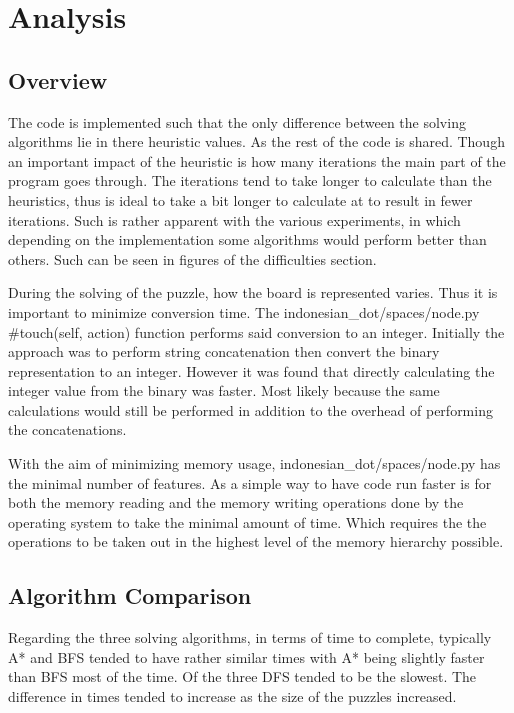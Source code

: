 \section{Analysis}
\subsection{Overview}
The code is implemented such that the only difference between the solving algorithms lie in there heuristic values. As the rest of the code is shared. Though an important impact of the heuristic is how many iterations the main part of the program goes through. The iterations tend to take longer to calculate than the heuristics, thus is ideal to take a bit longer to calculate at to result in fewer iterations. Such is rather apparent with the various experiments, in which depending on the implementation some algorithms would perform better than others. Such can be seen in figures of the difficulties section.
\newline
\newline

During the solving of the puzzle, how the board is represented varies. Thus it is important to minimize conversion time. The indonesian\_dot/spaces/node.py \#touch(self, action) function performs said conversion to an integer. Initially the approach was to perform string concatenation then convert the binary representation to an integer. However it was found that directly calculating the integer value from the binary was faster. Most likely because the same calculations would still be performed in addition to the overhead of performing the concatenations.
\newline
\newline

With the aim of minimizing memory usage, indonesian\_dot/spaces/node.py has the minimal number of features. As a simple way to have code run faster is for both the memory reading and the memory writing operations done by the operating system to take the minimal amount of time. Which requires the the operations to be taken out in the highest level of the memory hierarchy possible.
\newline
\newline
\subsection{Algorithm Comparison}

Regarding the three solving algorithms, in terms of time to complete, typically A* and BFS tended to have rather similar times with A* being slightly faster than BFS most of the time. Of the three DFS tended to be the slowest. The difference in times tended to increase as the size of the puzzles increased.
\newline
\newline

